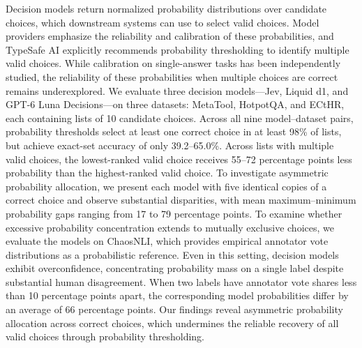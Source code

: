 Decision models return normalized probability distributions over candidate choices, which downstream systems can use to select valid choices. Model providers emphasize the reliability and calibration of these probabilities, and TypeSafe AI explicitly recommends probability thresholding to identify multiple valid choices. While calibration on single-answer tasks has been independently studied, the reliability of these probabilities when multiple choices are correct remains underexplored. We evaluate three decision models—Jev, Liquid d1, and GPT-6 Luna Decisions—on three datasets: MetaTool, HotpotQA, and ECtHR, each containing lists of 10 candidate choices. Across all nine model–dataset pairs, probability thresholds select at least one correct choice in at least 98\% of lists, but achieve exact-set accuracy of only 39.2–65.0\%. Across lists with multiple valid choices, the lowest-ranked valid choice receives 55–72 percentage points less probability than the highest-ranked valid choice. To investigate asymmetric probability allocation, we present each model with five identical copies of a correct choice and observe substantial disparities, with mean maximum–minimum probability gaps ranging from 17 to 79 percentage points. To examine whether excessive probability concentration extends to mutually exclusive choices, we evaluate the models on ChaosNLI, which provides empirical annotator vote distributions as a probabilistic reference. Even in this setting, decision models exhibit overconfidence, concentrating probability mass on a single label despite substantial human disagreement. When two labels have annotator vote shares less than 10 percentage points apart, the corresponding model probabilities differ by an average of 66 percentage points. Our findings reveal asymmetric probability allocation across correct choices, which undermines the reliable recovery of all valid choices through probability thresholding.
